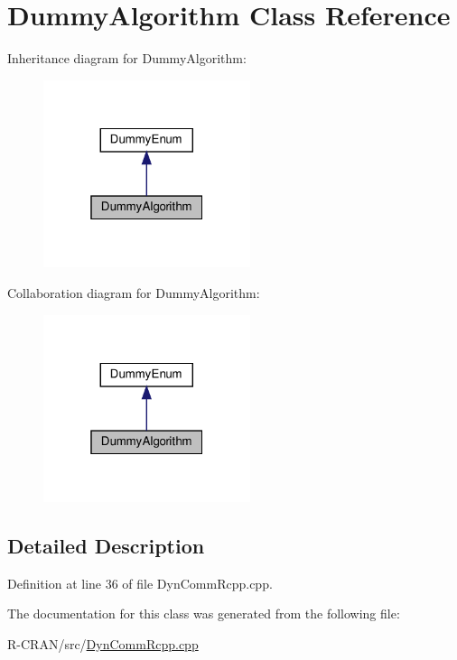 \hypertarget{classDummyAlgorithm}{}\section{Dummy\+Algorithm Class Reference}
\label{classDummyAlgorithm}


Inheritance diagram for Dummy\+Algorithm\+:
\nopagebreak
\begin{figure}[H]
\begin{center}
\leavevmode
\includegraphics[width=172pt]{classDummyAlgorithm__inherit__graph}
\end{center}
\end{figure}


Collaboration diagram for Dummy\+Algorithm\+:
\nopagebreak
\begin{figure}[H]
\begin{center}
\leavevmode
\includegraphics[width=172pt]{classDummyAlgorithm__coll__graph}
\end{center}
\end{figure}


\subsection{Detailed Description}


Definition at line 36 of file Dyn\+Comm\+Rcpp.\+cpp.



The documentation for this class was generated from the following file\+:\begin{DoxyCompactItemize}
\item 
R-\/\+C\+R\+A\+N/src/\hyperlink{DynCommRcpp_8cpp}{Dyn\+Comm\+Rcpp.\+cpp}\end{DoxyCompactItemize}
